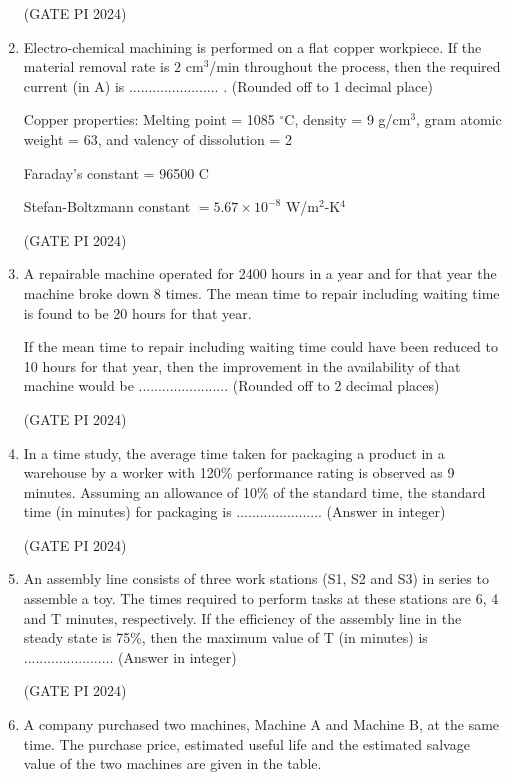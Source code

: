 \documentclass[journal,12pt,onecolumn]{IEEEtran}
\theoremstyle{remark}
\begin{document}
\begin{enumerate}
\hfill (GATE PI 2024)
\item Electro-chemical machining is performed on a flat copper workpiece. If the material removal rate is $2$ cm$^3$/min throughout the process, then the required current (in A) is ....................... . (Rounded off to 1 decimal place)

Copper properties: Melting point = 1085 $^\circ$C, density = 9 g/cm$^3$, gram atomic weight = 63, and valency of dissolution = 2

Faraday's constant = 96500 C

Stefan-Boltzmann constant $= 5.67 \times 10^{-8}$ W/m$^2$-K$^4$

\hfill (GATE PI 2024)

\item A repairable machine operated for 2400 hours in a year and for that year the machine broke down 8 times. The mean time to repair including waiting time is found to be 20 hours for that year.

If the mean time to repair including waiting time could have been reduced to 10 hours for that year, then the improvement in the availability of that machine would be ....................... (Rounded off to 2 decimal places)

\hfill (GATE PI 2024)

\item In a time study, the average time taken for packaging a product in a warehouse by a worker with 120\% performance rating is observed as 9 minutes. Assuming an allowance of 10\% of the standard time, the standard time (in minutes) for packaging is ...................... (Answer in integer)

\hfill (GATE PI 2024)

\item An assembly line consists of three work stations (S1, S2 and S3) in series to assemble a toy. The times required to perform tasks at these stations are 6, 4 and T minutes, respectively. If the efficiency of the assembly line in the steady state is 75\%, then the maximum value of T (in minutes) is ....................... (Answer in integer)

\hfill (GATE PI 2024)


\item A company purchased two machines, Machine A and Machine B, at the same time. The purchase price, estimated useful life and the estimated salvage value of the two machines are given in the table.




\end{enumerate}
\end{document}
